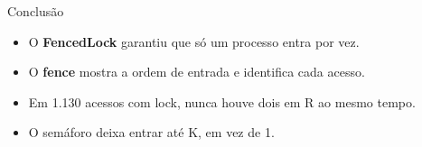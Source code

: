 \documentclass[aspectratio=169,11pt]{beamer}
\begin{document}
\begin{frame}{Conclusão}
\begin{itemize}\setlength\itemsep{0.4cm}
\item O \textbf{FencedLock} garantiu que só um processo entra por vez.
\item O \textbf{fence} mostra a ordem de entrada e identifica cada acesso.
\item Em 1.130 acessos com lock, nunca houve dois em R ao mesmo tempo.
\item O semáforo deixa entrar até K, em vez de 1.
\end{itemize}
\vspace{0.5cm}
\end{frame}
\end{document}
